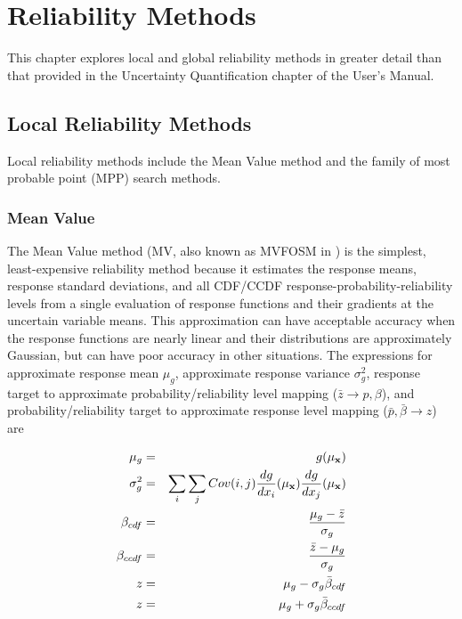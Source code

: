 \chapter{Reliability Methods}\label{uq:reliability}

This chapter explores local and global reliability methods in greater
detail than that provided in the Uncertainty Quantification chapter of
the User's Manual.


\section{Local Reliability Methods}\label{uq:reliability:local}

Local reliability methods include the Mean Value method and the family
of most probable point (MPP) search methods.


\subsection{Mean Value}\label{uq:reliability:local:mv}

The Mean Value method (MV, also known as MVFOSM in \cite{Hal00}) is
the simplest, least-expensive reliability method because it estimates
the response means, response standard deviations, and all CDF/CCDF
response-probability-reliability levels from a single evaluation of
response functions and their gradients at the uncertain variable
means.  This approximation can have acceptable accuracy when the
response functions are nearly linear and their distributions are
approximately Gaussian, but can have poor accuracy in other
situations.  The expressions for approximate response mean $\mu_g$,
approximate response variance $\sigma^2_g$, response target to
approximate probability/reliability level mapping ($\bar{z} \to p,\beta$),
and probability/reliability target to approximate response level mapping
($\bar{p},\bar{\beta} \to z$) are

\begin{eqnarray}
\mu_g      & = & g(\mu_{\bf x})  \label{eq:mv_mean1} \\
\sigma^2_g & = & \sum_i \sum_j Cov(i,j) \frac{dg}{dx_i}(\mu_{\bf x})
                 \frac{dg}{dx_j}(\mu_{\bf x}) \label{eq:mv_std_dev} \\
\beta_{cdf}  & = & \frac{\mu_g - \bar{z}}{\sigma_g} \label{eq:mv_ria_cdf} \\
\beta_{ccdf} & = & \frac{\bar{z} - \mu_g}{\sigma_g} \label{eq:mv_ria_ccdf} \\
z        & = & \mu_g - \sigma_g \bar{\beta}_{cdf} \label{eq:mv_pma_cdf} \\
z        & = & \mu_g + \sigma_g \bar{\beta}_{ccdf} \label{eq:mv_pma_ccdf}
\end{eqnarray}


